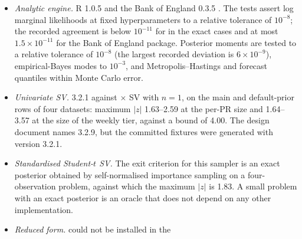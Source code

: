 \begin{itemize}
\item \emph{Analytic engine.} R  1.0.5 \citep{kuschnig2021bvar} and the Bank of England
 0.3.5 \citep{labonne2026bvar}. The tests assert log marginal likelihoods at fixed
hyperparameters to a relative tolerance of $10^{-8}$; the recorded agreement is below $10^{-11}$ for
 in the exact cases and at most $1.5\times10^{-11}$ for the Bank of England package.
Posterior moments are tested to a relative tolerance of $10^{-8}$ (the largest recorded deviation
is $6\times10^{-9}$), empirical-Bayes modes to $10^{-3}$, and Metropolis--Hastings and forecast
quantiles within Monte Carlo error.
\item \emph{Univariate SV.}  3.2.1 \citep{kastner2016dealing,hosszejni2021modeling}
against  $\times$ SV with $n = 1$, on the main and default-prior rows of four
datasets: maximum $|z|$ 1.63--2.59 at the per-PR size and 1.64--3.57 at the size of the weekly tier, against a bound of 4.00.
The design document names  3.2.9, but the committed fixtures were generated with
version 3.2.1. %
\item \emph{Standardised Student-$t$ SV.} The exit criterion for this sampler is an exact posterior
obtained by self-normalised importance sampling on a four-observation problem, against which the
maximum $|z|$ is 1.83. A small problem with an exact posterior is an oracle that does not depend on
any other implementation.
\item \emph{Reduced form.}  \citep{gruber2026bayesianvars} could not be installed in the

\end{itemize}
